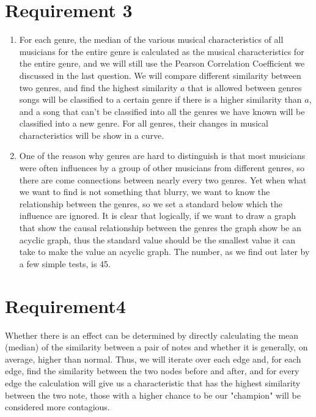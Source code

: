 \documentclass[12pt]{article}
\begin{document}
\section{Requirement 3}
\begin{enumerate}
    \item For each genre, the median of the various musical characteristics of all musicians for the entire genre is calculated as the musical characteristics
          for the entire genre, and we will still use the Pearson Correlation Coefficient we discussed in the last question. We will compare different similarity between two
          genres, and find the highest similarity $a$ that is allowed between genres songs will be classified to a certain genre if there is a higher similarity than $a$, and a song
          that can't be classified into all the genres we have known will be classified into a new genre. For all genres, their changes in musical characteristics will be show in
          a curve.

    \item One of the reason why genres are hard to distinguish is that most musicians were often influences by a group of other musicians from different genres, so there are
          come connections between nearly every two genres. Yet when what we want to find is not something that blurry, we want to know the relationship between the genres,
          so we set a standard below which the influence are ignored. It is clear that logically, if we want to draw a graph that show the causal relationship between the genres
          the graph show be an acyclic graph, thus the standard value should be the smallest value it can take to make the value an acyclic graph. The number, as we find out later
          by a few simple tests, is 45.
\end{enumerate}

\section{Requirement4}\Large
Whether there is an effect can be determined by directly calculating the mean (median) of the similarity between a pair  of notes and whether it is generally,
on average, higher than normal. Thus, we will iterate over each edge and, for each edge, find the similarity between the two nodes before and after, and for every
edge the calculation will give us a characteristic that has the highest similarity between the two note, those with a higher chance to be our "champion" will be considered
more contagious.
\end{document}
